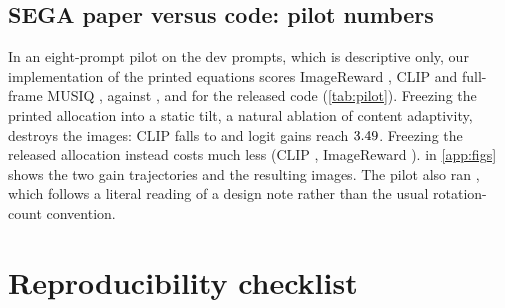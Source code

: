 \begin{table}[!htbp]
\centering
\caption{\textbf{Dev-set selection (rows 0--7, seed 0, $n=8$); selection evidence only.} Each cell: mean, and below it the difference from the campaign's \segaofficial{} reference. $^{a}$Partial held-out run ( prompts) started before the dev decision. $^{b}$Fresh rerun; the second line is its difference from the pilot run. $^{c}$Passed the dev gate; never evaluated on held-out prompts.}
\label{tab:dev}
\scriptsize
\setlength{\tabcolsep}{3pt}

\end{table}

\subsection{SEGA paper versus code: pilot numbers}\label{app:pilot}

In an eight-prompt pilot on the dev prompts, which is descriptive only, our implementation of the printed equations scores ImageReward , CLIP  and full-frame MUSIQ , against ,  and  for the released code (\cref{tab:pilot}). Freezing the printed allocation into a static tilt, a natural ablation of content adaptivity, destroys the images: CLIP falls to  and logit gains reach $3.49$. Freezing the released allocation instead costs much less (CLIP , ImageReward ).  in \cref{app:figs} shows the two gain trajectories and the resulting images. The pilot also ran \yarn{}, which follows a literal reading of a design note rather than the usual rotation-count convention.

\begin{table}[!htbp]
\centering
\caption{\textbf{Eight-prompt pilot on the dev prompts (rows 0--7, seed 0), descriptive only.} Means; triangles mark nominal paired bootstrap intervals against \segaofficial{} that exclude zero in the better or worse direction, which with $n=8$ is indicative at best. Static variants freeze the allocation instead of reading the current latent.}
\label{tab:pilot}
\scriptsize
\setlength{\tabcolsep}{2.4pt}

\end{table}



\FloatBarrier
\section{Reproducibility checklist}\label{app:repro}

